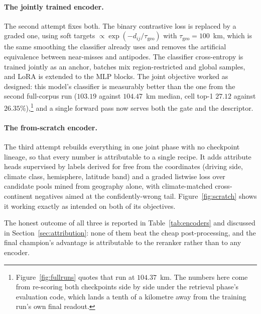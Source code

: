 \documentclass[11pt,a4paper]{article}
\begin{document}
\paragraph{The jointly trained encoder.}
The second attempt fixes both. The binary contrastive loss is replaced by a graded one, using
soft targets $\propto \exp(-d_{ij}/\tau_{\mathrm{geo}})$ with $\tau_{\mathrm{geo}} = 100$~km,
which is the same smoothing the classifier already uses and removes the artificial
equivalence between near-misses and antipodes. The classifier cross-entropy is trained
jointly as an anchor, batches mix region-restricted and global samples, and LoRA is extended
to the MLP blocks. The joint objective worked as designed: this model's classifier is
measurably better than the one from the second full-corpus run ($103.19$ against
$104.47$~km median, cell top-1 $27.12$ against $26.35\%$),\footnote{Figure~\ref{fig:fullruns}
quotes that run at $104.37$~km. The numbers here come from re-scoring both checkpoints side
by side under the retrieval phase's evaluation code, which lands a tenth of a kilometre away
from the training run's own final readout.} and a single forward pass now serves both the
gate and the descriptor.

\paragraph{The from-scratch encoder.}
The third attempt rebuilds everything in one joint phase with no checkpoint lineage, so that
every number is attributable to a single recipe. It adds attribute heads supervised by labels
derived for free from the coordinates (driving side, climate class, hemisphere, latitude
band) and a graded listwise loss over candidate pools mined from geography alone, with
climate-matched cross-continent negatives aimed at the confidently-wrong tail.
Figure~\ref{fig:scratch} shows it working exactly as intended on both of its objectives.

The honest outcome of all three is reported in Table~\ref{tab:encoders} and discussed in
Section~\ref{sec:attribution}: none of them beat the cheap post-processing, and the final
champion's advantage is attributable to the reranker rather than to any encoder.
\end{document}
